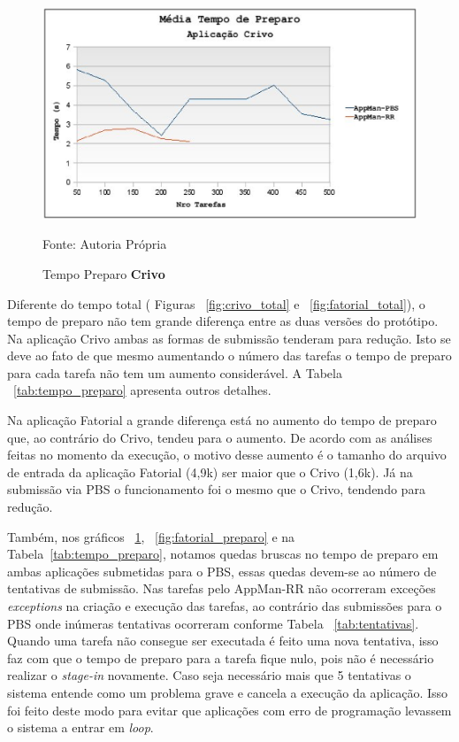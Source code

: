 \begin{figure}[hbtp]
\begin{center}
\includegraphics[scale=0.77]{./img/PreparoCrivo.ps}
\caption{Tempo Preparo \textbf{Crivo}}
\label{fig:crivo_preparo}
Fonte: Autoria Própria
\end{center}
\end{figure}


Diferente do tempo total ( Figuras ~\ref{fig:crivo_total} e ~\ref{fig:fatorial_total}), o tempo de preparo não tem grande diferença entre as duas versões do protótipo. Na aplicação Crivo ambas as formas de submissão tenderam para redução. Isto se deve ao fato de que mesmo aumentando o número das tarefas o tempo de preparo para cada tarefa não tem um aumento considerável. A Tabela ~\ref{tab:tempo_preparo} apresenta outros detalhes.

Na aplicação Fatorial a grande diferença está no aumento do tempo de preparo que, ao contrário do Crivo, tendeu para o aumento. De acordo com as análises feitas no momento da execução, o motivo desse aumento é o tamanho do arquivo de entrada da aplicação Fatorial (4,9k) ser maior que o Crivo (1,6k). Já na submissão via PBS o funcionamento foi o mesmo que o Crivo, tendendo para redução. 

Também, nos gráficos ~\ref{fig:crivo_preparo}, ~\ref{fig:fatorial_preparo} e na Tabela~\ref{tab:tempo_preparo}, notamos quedas bruscas no tempo de preparo em ambas aplicações submetidas para o PBS, essas quedas devem-se ao número de tentativas de submissão. Nas tarefas pelo AppMan-RR não ocorreram exceções \emph{exceptions} na criação e execução das tarefas, ao contrário das submissões para o PBS onde inúmeras tentativas ocorreram conforme Tabela ~\ref{tab:tentativas}. Quando uma tarefa não consegue ser executada é feito uma nova tentativa, isso faz com que o tempo de preparo para a tarefa fique nulo, pois não é necessário realizar o \emph{stage-in} novamente. Caso seja necessário mais que 5 tentativas o sistema entende como um problema grave e cancela a execução da aplicação. Isso foi feito deste modo para evitar que aplicações com erro de programação levassem o sistema a entrar em \emph{loop}.

